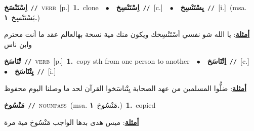 \documentclass[10pt,a4paper,twoside]{article} %
\begin{document}
\begin{multicols}{2}
{\setlength\topsep{0pt}\textbf{\foreignlanguage{arabic}{اِسْتَنْسَخ}}\ {\color{gray}\texttt{//}\color{black}}\ \textsc{verb}\ [p.]\ \textbf{1.}~clone\ \ $\bullet$\ \ \setlength\topsep{0pt}\textbf{\foreignlanguage{arabic}{اِسْتَنْسِخ}}\ {\color{gray}\texttt{//}\color{black}}\ [c.]\ \ $\bullet$\ \ \setlength\topsep{0pt}\textbf{\foreignlanguage{arabic}{يِسْتَنْسِخ}}\ {\color{gray}\texttt{//}\color{black}}\ [i.]\ \color{gray}(msa. \foreignlanguage{arabic}{يَسْتَنْسِخ}~\foreignlanguage{arabic}{\textbf{١.}})\color{black}\  \begin{flushright}\color{gray}\foreignlanguage{arabic}{\textbf{\underline{\foreignlanguage{arabic}{أمثلة}}}: يا الله شو نفسي أسْتَنْسِخك ويكون منك مية نسخة بهالعالم عقد ما أنت محترم وابن ناس}\end{flushright}\color{black}} \vspace{2mm}

{\setlength\topsep{0pt}\textbf{\foreignlanguage{arabic}{تْنَاسَخ}}\ {\color{gray}\texttt{//}\color{black}}\ \textsc{verb}\ [p.]\ \textbf{1.}~copy sth from one person to another\ \ $\bullet$\ \ \setlength\topsep{0pt}\textbf{\foreignlanguage{arabic}{اِتْنَاسَخ}}\ {\color{gray}\texttt{//}\color{black}}\ [c.]\ \ $\bullet$\ \ \setlength\topsep{0pt}\textbf{\foreignlanguage{arabic}{يِتْنَاسَخ}}\ {\color{gray}\texttt{//}\color{black}}\ [i.]\  \begin{flushright}\color{gray}\foreignlanguage{arabic}{\textbf{\underline{\foreignlanguage{arabic}{أمثلة}}}: ضلُّوا المسلمين من عهد الصحابة يِتْناسَخوا القرآن لحد ما وصلنا اليوم محفوظ}\end{flushright}\color{black}} \vspace{2mm}

{\setlength\topsep{0pt}\textbf{\foreignlanguage{arabic}{مَنْسُوخ}}\ {\color{gray}\texttt{//}\color{black}}\ \textsc{noun\textunderscore pass}\ \color{gray}(msa. \foreignlanguage{arabic}{مَنْسُوخ}~\foreignlanguage{arabic}{\textbf{١.}})\color{black}\ \textbf{1.}~copied\  \begin{flushright}\color{gray}\foreignlanguage{arabic}{\textbf{\underline{\foreignlanguage{arabic}{أمثلة}}}: ميس هدى بدها الواجب مَنْسُوخ مية مرة}\end{flushright}\color{black}} \vspace{2mm}


\end{multicols}
\end{document}
